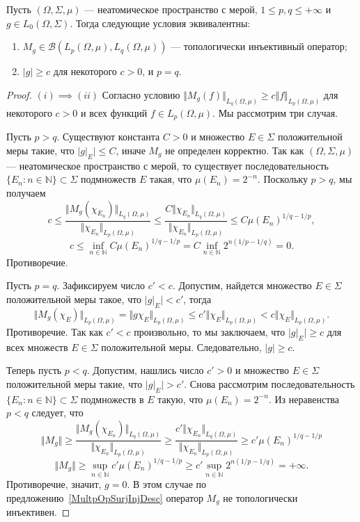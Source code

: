 \begin{proposition}\label{TopInjMultOpCharacOnNonAtomMeasSp} Пусть
$(\Omega,\Sigma,\mu)$ --- неатомическое пространство с мерой, 
$1\leq p,q\leq +\infty$ и $g\in L_0(\Omega,\Sigma)$. 
Тогда следующие условия эквивалентны:

\begin{enumerate}[label = (\roman*)]
    \item $M_g\in\mathcal{B}(L_p(\Omega,\mu),L_q(\Omega,\mu))$ --- топологически
    инъективный оператор;

    \item $|g|\geq c$ для некоторого $c>0$, и $p=q$.
\end{enumerate}
\end{proposition}
\begin{proof}
$(i) \implies (ii)$ Согласно условию 
$\Vert M_g(f)\Vert_{L_q(\Omega,\mu)}\geq c\Vert f\Vert_{L_p(\Omega,\mu)}$ 
для некоторого $c>0$ и всех функций $f\in L_p(\Omega,\mu)$. 
Мы рассмотрим три случая.

Пусть $p>q$. Существуют константа $C>0$ и множество $E\in\Sigma$ положительной
меры такие, что $|g|_E|\leq C$, иначе $M_g$ не определен корректно. Так как
$(\Omega,\Sigma,\mu)$ --- неатомическое пространство с мерой, то существует
последовательность $ \{E_n:n\in\mathbb{N} \}\subset\Sigma$ подмножеств $E$
такая, что $\mu(E_n)=2^{-n}$. Поскольку $p>q$, мы получаем
$$
c
\leq\frac{
    \Vert M_g(\chi_{E_n})\Vert_{L_q(\Omega,\mu)}
}{
    \Vert \chi_{E_n}\Vert_{L_p(\Omega,\mu)}
}
\leq\frac{
    C\Vert\chi_{E_n}\Vert_{L_q(\Omega,\mu)}
}{
    \Vert \chi_{E_n}\Vert_{L_p(\Omega,\mu)}
}
\leq C{\mu(E_n)}^{1/q-1/p},
$$
$$
c
\leq\inf_{n\in\mathbb{N}}C{\mu(E_n)}^{1/q-1/p}
=C\inf_{n\in\mathbb{N}} 2^{n(1/p-1/q)}=0.
$$
Противоречие.

Пусть $p=q$. Зафиксируем число $c'<c$. Допустим, найдется множество 
$E\in\Sigma$ положительной меры такое, что $|g|_{E}|<c'$, тогда
$$
\Vert M_g(\chi_{E})\Vert_{L_p(\Omega,\mu)}
=\Vert g \chi_{E}\Vert_{L_p(\Omega,\mu)}
\leq c' \Vert \chi_{E}\Vert_{L_p(\Omega,\mu)}
<c\Vert \chi_{E}\Vert_{L_p(\Omega,\mu)}.
$$
Противоречие. Так как $c'<c$ произвольно, то мы заключаем, что $|g|_E|\geq c$
для всех множеств $E\in\Sigma$ положительной меры. Следовательно, $|g|\geq c$.

Теперь пусть $p<q$. Допустим, нашлись число $c'>0$ и множество $E\in\Sigma$
положительной меры такие, что $|g|_E|>c'$. Снова рассмотрим последовательность 
$\{E_n:n\in\mathbb{N} \}\subset\Sigma$ подмножеств в $E$ такую, что
$\mu(E_n)=2^{-n}$. Из неравенства $p<q$ следует, что
$$
\Vert M_g\Vert
\geq\frac{
    \Vert M_g(\chi_{E_n})\Vert_{L_q(\Omega,\mu)}
}{
    \Vert \chi_{E_n}\Vert_{L_p(\Omega,\mu)}
}
\geq\frac{
    c'\Vert\chi_{E_n}\Vert_{L_q(\Omega,\mu)}
}{
    \Vert \chi_{E_n}\Vert_{L_p(\Omega,\mu)}
}
\geq c'{\mu(E_n)}^{1/q-1/p}
$$
$$
\Vert M_g\Vert
\geq\sup_{n\in\mathbb{N}}c'{\mu(E_n)}^{1/q-1/p}
\geq c'\sup_{n\in\mathbb{N}}2^{n(1/p-1/q)}
=+\infty.
$$
Противоречие, значит, $g=0$. В этом случае по
предложению~\ref{MultpOpSurjInjDesc} оператор $M_g$ не топологически инъективен.


\end{proof}
